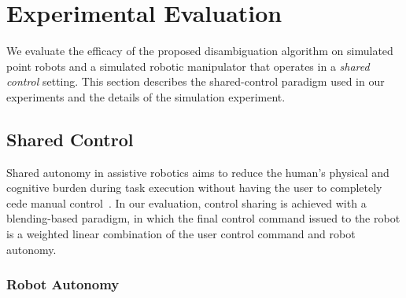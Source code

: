 \documentclass[letterpaper, 10 pt, conference]{ieeeconf}  %
\begin{document}
\section{Experimental Evaluation}\label{sec:ed}
We evaluate the efficacy of the proposed disambiguation algorithm on simulated point robots and a simulated robotic manipulator that operates in a \textit{shared control} setting. This section describes the shared-control paradigm used in our experiments and the details of the simulation experiment. 
\subsection{Shared Control}\label{ssec:shared-control}
Shared autonomy in assistive robotics aims to reduce the human's physical and cognitive burden during task execution without having the user to completely cede manual control~\cite{muelling2017autonomy}. 
In our evaluation, control sharing is achieved with a blending-based paradigm, in which the final control command issued to the robot is a weighted linear combination of the user control command and robot autonomy.
\subsubsection{Robot Autonomy}\label{sssec:autonomy}
\end{document}
